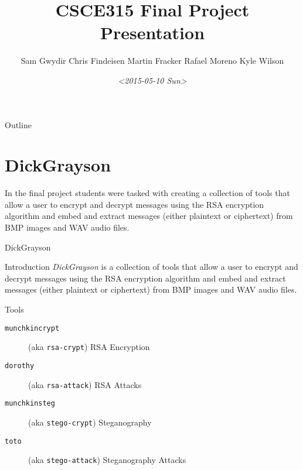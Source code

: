 \documentclass[presentation]{beamer}
\author{Sam Gwydir Chris Findeisen Martin Fracker Rafael Moreno Kyle Wilson}
\date{\textit{<2015-05-10 Sun>}}
\title{CSCE315 Final Project Presentation}
\begin{document}
\maketitle
\begin{frame}{Outline}
\tableofcontents
\end{frame}


\section{DickGrayson}
\label{sec:orgheadline1}
\begin{ABSTRACT}
In the final project students were tasked with creating a collection of tools
that allow a user to encrypt and decrypt messages using the RSA encryption
algorithm and embed and extract messages (either plaintext or ciphertext) from
BMP images and WAV audio files.
\end{ABSTRACT}

\begin{frame}[fragile,label=sec-1-1]{DickGrayson}
 \begin{block}{Introduction}
\emph{DickGrayson} is a collection of tools that allow a user to encrypt and decrypt
messages using the RSA encryption algorithm and embed and extract messages
(either plaintext or ciphertext) from BMP images and WAV audio files.
\end{block}

\begin{block}{Tools}
\begin{description}
\item[{\texttt{munchkincrypt}}] (aka \texttt{rsa-crypt}) RSA Encryption
\item[{\texttt{dorothy}}] (aka \texttt{rsa-attack}) RSA Attacks
\item[{\texttt{munchkinsteg}}] (aka \texttt{stego-crypt}) Steganography
\item[{\texttt{toto}}] (aka \texttt{stego-attack}) Steganography Attacks
\end{description}
\end{block}
\end{frame}
\end{document}
